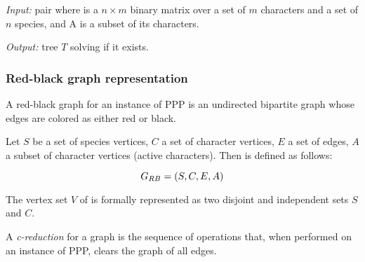 \begin{definition}\label{def:ppp}
  \text{}

  \textit{Input:} pair \ma{} where \m{} is a $n \times m$ binary matrix over a set of $m$ characters and a set of $n$ species, and A is a subset of its characters.

  \textit{Output:} tree $T$ solving \m{} if it exists.
\end{definition}

\subsubsection{Red-black graph representation}\label{sssec:grb}

A red-black graph for an instance of PPP is an undirected bipartite graph whose edges are colored as either red or black.

\begin{definition}\label{def:grb}
  Let $S$ be a set of species vertices, $C$ a set of character vertices, $E$ a set of edges, $A$ a subset of character vertices (active characters).
  Then \grb{} is defined as follows:

  \[ G_{RB}{} = (S, C, E, A) \]

  The vertex set $V$ of \grb{} is formally represented as two disjoint and independent sets $S$ and $C$.
\end{definition}


A \emph{c-reduction} for a graph \grb{} is the sequence of operations that, when performed on an instance of PPP, clears the graph of all edges.

